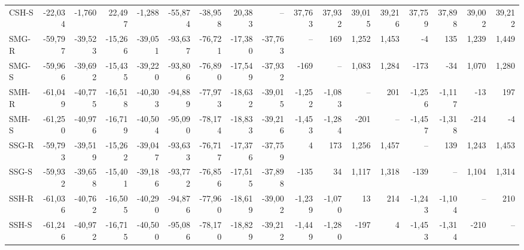 \documentclass[]{article}
\begin{document}
\begin{landscape}
\begin{table}
\begin{tabular}[t]{lrrrrrrrrrrrrrrrr}
CSH-S & -22,034 & -1,760 & 22,497 & -1,288 & -55,874 & -38,958 & 20,383 & -- & 37,763 & 37,932 & 39,015 & 39,216 & 37,759 & 37,898 & 39,002 & 39,212\\
\addlinespace
SMG-R & -59,797 & -39,523 & -15,266 & -39,051 & -93,637 & -76,721 & -17,380 & -37,763 & -- & 169 & 1,252 & 1,453 & -4 & 135 & 1,239 & 1,449\\
SMG-S & -59,966 & -39,692 & -15,435 & -39,220 & -93,806 & -76,890 & -17,549 & -37,932 & -169 & -- & 1,083 & 1,284 & -173 & -34 & 1,070 & 1,280\\
SMH-R & -61,049 & -40,775 & -16,518 & -40,303 & -94,889 & -77,973 & -18,632 & -39,015 & -1,252 & -1,083 & -- & 201 & -1,256 & -1,117 & -13 & 197\\
SMH-S & -61,250 & -40,976 & -16,719 & -40,504 & -95,090 & -78,174 & -18,833 & -39,216 & -1,453 & -1,284 & -201 & -- & -1,457 & -1,318 & -214 & -4\\
\addlinespace
SSG-R & -59,793 & -39,519 & -15,262 & -39,047 & -93,633 & -76,717 & -17,376 & -37,759 & 4 & 173 & 1,256 & 1,457 & -- & 139 & 1,243 & 1,453\\
SSG-S & -59,932 & -39,658 & -15,401 & -39,186 & -93,772 & -76,856 & -17,515 & -37,898 & -135 & 34 & 1,117 & 1,318 & -139 & -- & 1,104 & 1,314\\
SSH-R & -61,036 & -40,762 & -16,505 & -40,290 & -94,876 & -77,960 & -18,619 & -39,002 & -1,239 & -1,070 & 13 & 214 & -1,243 & -1,104 & -- & 210\\
SSH-S & -61,246 & -40,972 & -16,715 & -40,500 & -95,086 & -78,170 & -18,829 & -39,212 & -1,449 & -1,280 & -197 & 4 & -1,453 & -1,314 & -210 & --\\
\bottomrule
\end{tabular}
\end{table}
\end{landscape}
\end{document}
